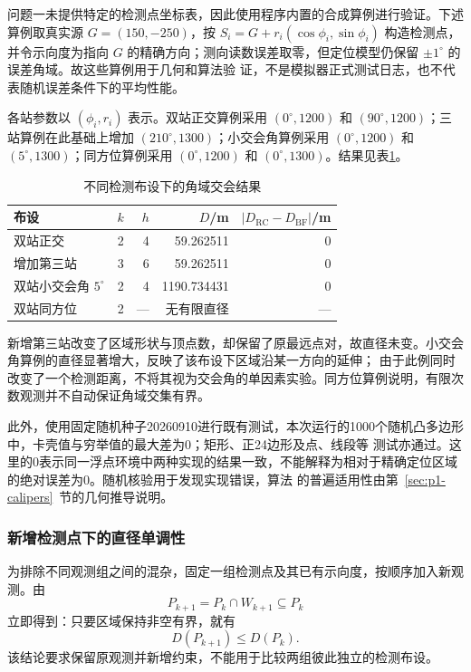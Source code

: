 问题一未提供特定的检测点坐标表，因此使用程序内置的合成算例进行验证。下述算例取真实源 $G=(150,-250)$，按 $S_i=G+r_i(\cos\phi_i,\sin\phi_i)$ 
构造检测点，并令示向度为指向 $G$ 的精确方向；测向读数误差取零，但定位模型仍保留 $\pm1^\circ$ 的误差角域。故这些算例用于几何和算法验
证，不是模拟器正式测试日志，也不代表随机误差条件下的平均性能。

各站参数以 $(\phi_i,r_i)$ 表示。双站正交算例采用 $(0^\circ,1200)$ 和 $(90^\circ,1200)$；三站算例在此基础上增加 
$(210^\circ,1300)$；小交会角算例采用 $(0^\circ,1200)$ 和 $(5^\circ,1300)$；同方位算例采用 $(0^\circ,1200)$ 和 
$(0^\circ,1300)$。结果见表\ref{tab:p1-cases}。
\begin{table}[H]
\centering
\caption{不同检测布设下的角域交会结果}\label{tab:p1-cases}
\begin{tabular}{lrrrr}
\toprule
布设 & $k$ & $h$ & $D$/m & $|D_{\mathrm{RC}}-D_{\mathrm{BF}}|$/m\\
\midrule
双站正交 & 2 & 4 & 59.262511 & 0\\
增加第三站 & 3 & 6 & 59.262511 & 0\\
双站小交会角 $5^\circ$ & 2 & 4 & 1190.734431 & 0\\
双站同方位 & 2 & --- & 无有限直径 & ---\\
\bottomrule
\end{tabular}
\end{table}

新增第三站改变了区域形状与顶点数，却保留了原最远点对，故直径未变。小交会角算例的直径显著增大，反映了该布设下区域沿某一方向的延伸；
由于此例同时改变了一个检测距离，不将其视为交会角的单因素实验。同方位算例说明，有限次数观测并不自动保证角域交集有界。

此外，使用固定随机种子20260910进行既有测试，本次运行的1000个随机凸多边形中，卡壳值与穷举值的最大差为0；矩形、正24边形及点、线段等
测试亦通过。这里的0表示同一浮点环境中两种实现的结果一致，不能解释为相对于精确定位区域的绝对误差为0。随机核验用于发现实现错误，算法
的普遍适用性由第~\ref{sec:p1-calipers}~节的几何推导说明。

\subsubsection{新增检测点下的直径单调性}

为排除不同观测组之间的混杂，固定一组检测点及其已有示向度，按顺序加入新观测。由
\begin{equation}
P_{k+1}=P_k\cap W_{k+1}\subseteq P_k
\end{equation}
立即得到：只要区域保持非空有界，就有
\begin{equation}\label{eq:p1-monotone}
D(P_{k+1})\le D(P_k).
\end{equation}
该结论要求保留原观测并新增约束，不能用于比较两组彼此独立的检测布设。

